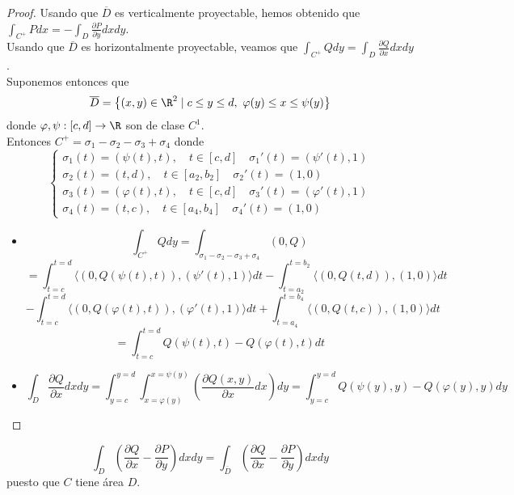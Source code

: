 \begin{proof}
    Usando que $\overline{D}$ es verticalmente proyectable, hemos obtenido que
    $\int_{C^+} Pdx = -\int_{D} \frac{\partial P}{\partial y}dxdy$.\\ Usando que
    $\overline{D}$ es horizontalmente proyectable, veamos que $\int_{C^+} Qdy =
        \int_{D} \frac{\partial Q}{\partial x}dxdy$.\\ Suponemos entonces que
    $$\overline{D} = \left\{ (x,y) \in \R^2 \mid c \leq y \leq d, \ \varphi(y) \leq
        x \leq \psi(y) \right\}$$ donde $\varphi, \psi: [c,d] \to \R$ son de clase
    $C^1$.\\ Entonces $C^+ = \sigma_1 - \sigma_2 - \sigma_3 + \sigma_4$ donde $$
        \begin{cases}
            \sigma_1(t) = (\psi(t), t), \quad t \in [c,d] \quad \sigma_1'(t) = (\psi'(t), 1)       \\
            \sigma_2(t) = (t, d), \quad t \in [a_2, b_2] \quad \sigma_2'(t) = (1, 0)               \\
            \sigma_3(t) = (\varphi(t), t), \quad t \in [c,d] \quad \sigma_3'(t) = (\varphi'(t), 1) \\
            \sigma_4(t) = (t, c), \quad t \in [a_4, b_4] \quad \sigma_4'(t) = (1, 0)
        \end{cases}
    $$

    \begin{itemize}
        \item $$\int_{C^+} Qdy = \int_{\sigma_1 - \sigma_2 - \sigma_3 + \sigma_4} (0,Q) $$
              $$= \int_{t=c}^{t=d} \langle (0,Q(\psi(t),t)), (\psi'(t),1) \rangle dt - \int_{t=a_2}^{t=b_2} \langle (0,Q(t,d)), (1,0) \rangle dt $$
              $$- \int_{t=c}^{t=d} \langle (0,Q(\varphi(t),t)), (\varphi'(t),1) \rangle dt + \int_{t=a_4}^{t=b_4} \langle (0,Q(t,c)), (1,0) \rangle dt $$
              $$= \int_{t=c}^{t=d} Q(\psi(t),t) - Q(\varphi(t),t) dt$$
        \item $$\int_{D} \frac{\partial Q}{\partial x}dxdy = \int_{y=c}^{y=d} \int_{x=\varphi(y)}^{x=\psi(y)} \left( \frac{\partial Q(x,y)}{\partial x} dx \right) dy = \int_{y=c}^{y=d} Q(\psi(y),y) - Q(\varphi(y),y) dy$$
    \end{itemize}

\end{proof}

\begin{observación}
$$\int_{D} \left(\frac{\partial Q}{\partial x} - \frac{\partial P}{\partial y}\right)dxdy = \int_{\overline{D}} \left(\frac{\partial Q}{\partial x} - \frac{\partial P}{\partial y}\right)dxdy$$
puesto que $C$ tiene área $D$.
\end{observación}

